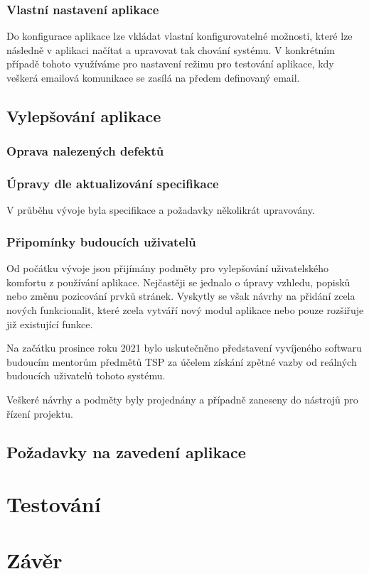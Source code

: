 \documentclass[czech,BP]{thesiskiv}
\begin{document}
	\subsection{Vlastní nastavení aplikace}
	\par Do konfigurace aplikace lze vkládat vlastní konfigurovatelné možnosti, které lze následně v aplikaci načítat a upravovat tak chování systému. V konkrétním případě tohoto využíváme pro nastavení režimu pro testování aplikace, kdy veškerá emailová komunikace se zasílá na předem definovaný email.
	\section{Vylepšování aplikace}
	\subsection{Oprava nalezených defektů}
	\subsection{Úpravy dle aktualizování specifikace}
	\par V průběhu vývoje byla specifikace a požadavky několikrát upravovány.
	\subsection{Připomínky budoucích uživatelů}
	\par Od počátku vývoje jsou přijímány podměty pro vylepšování uživatelského komfortu z používání aplikace. Nejčastěji se jednalo o úpravy vzhledu, popisků nebo změnu pozicování prvků stránek. Vyskytly se však návrhy na přidání zcela nových funkcionalit, které zcela vytváří nový modul aplikace nebo pouze rozšiřuje již existující funkce.
	\par Na začátku prosince roku 2021 bylo uskutečněno představení vyvíjeného softwaru budoucím mentorům předmětů TSP za účelem získání zpětné vazby od reálných budoucích uživatelů tohoto systému.
	\par Veškeré návrhy a podměty byly projednány a případně zaneseny do nástrojů pro řízení projektu.
	\section{Požadavky na zavedení aplikace}
	
\chapter{Testování}

\chapter{Závěr}


%
%
\lstlistoflistings

% 
%

{\raggedright\small

}
\end{document}
